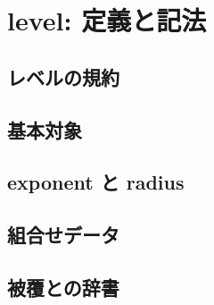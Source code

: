
\section{level: 定義と記法}

\subsection{レベルの規約}

\subsection{基本対象}

\subsection{exponent と radius}

\subsection{組合せデータ}

\subsection{被覆との辞書}
